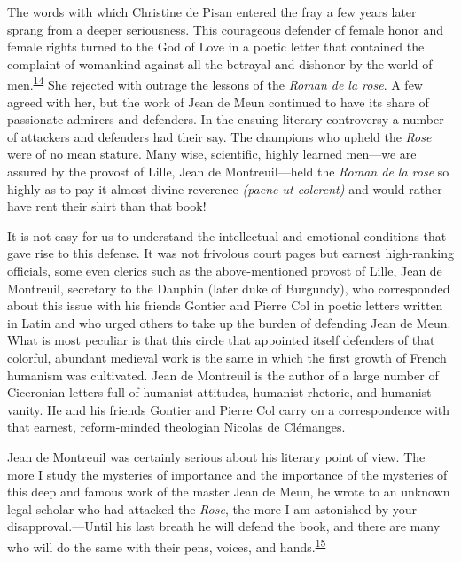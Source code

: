 The words with which Christine de Pisan entered the fray a few years
later sprang from a deeper seriousness. This courageous defender of
female honor and female rights turned to the God of Love in a poetic
letter that contained the complaint of womankind against all the
betrayal and dishonor by the world of
men.\textsuperscript{\protect\hypertarget{11_Chapter_Four__THE_FORMS_OF_LOVE.xhtmlux5cux23id_1460}{\protect\hyperlink{23_NOTES.xhtmlux5cux23id_1461}{14}}}
She rejected with outrage the lessons of the \emph{Roman de la rose}. A
few agreed with her, but the work of Jean de Meun continued to have its
share of passionate admirers and defenders. In the ensuing literary
controversy a number of attackers and defenders had their say. The
champions who upheld the \emph{Rose} were of no mean stature. Many wise,
scientific, highly learned men---we are assured by the provost of Lille,
Jean de Montreuil---held the \emph{Roman de la rose} so highly as to pay
it almost divine reverence \emph{(paene ut colerent)} and would rather
have rent their shirt than that book!

It is not easy for us to understand the intellectual and emotional
conditions that gave rise to this defense. It was not frivolous court
pages but earnest high-ranking officials, some even clerics such as the
above-mentioned provost of Lille, Jean de Montreuil, secretary to the
Dauphin (later duke of Burgundy), who corresponded about this issue with
his friends Gontier and Pierre Col in poetic letters written in Latin
and who urged others to take up the burden of
\protect\hypertarget{11_Chapter_Four__THE_FORMS_OF_LOVE.xhtmlux5cux23page_138}{}{}defending
Jean de Meun. What is most peculiar is that this circle that appointed
itself defenders of that colorful, abundant medieval work is the same in
which the first growth of French humanism was cultivated. Jean de
Montreuil is the author of a large number of Ciceronian letters full of
humanist attitudes, humanist rhetoric, and humanist vanity. He and his
friends Gontier and Pierre Col carry on a correspondence with that
earnest, reform-minded theologian Nicolas de Clémanges.

Jean de Montreuil was certainly serious about his literary point of
view. The more I study the mysteries of importance and the importance of
the mysteries of this deep and famous work of the master Jean de Meun,
he wrote to an unknown legal scholar who had attacked the \emph{Rose},
the more I am astonished by your disapproval.---Until his last breath he
will defend the book, and there are many who will do the same with their
pens, voices, and
hands.\textsuperscript{\protect\hypertarget{11_Chapter_Four__THE_FORMS_OF_LOVE.xhtmlux5cux23id_1458}{\protect\hyperlink{23_NOTES.xhtmlux5cux23id_1459}{15}}}


